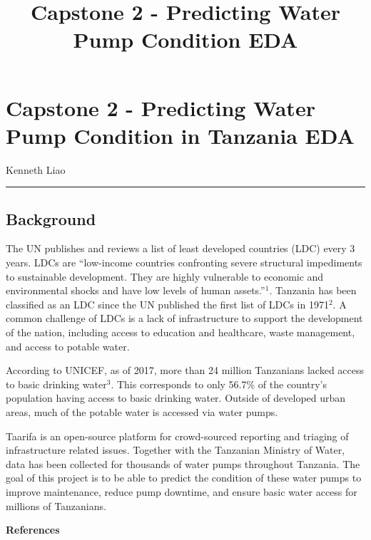 \documentclass[11pt]{article}
\title{Capstone 2 - Predicting Water Pump Condition EDA}
\begin{document}
    
    
    \maketitle
    
    

    
    \section{Capstone 2 - Predicting Water Pump Condition in Tanzania
EDA}\label{capstone-2---predicting-water-pump-condition-in-tanzania-eda}

    Kenneth Liao

    \begin{center}\rule{0.5\linewidth}{\linethickness}\end{center}

    \subsection{Background}\label{background}

    The UN publishes and reviews a list of least developed countries (LDC)
every 3 years. LDCs are ``low-income countries confronting severe
structural impediments to sustainable development. They are highly
vulnerable to economic and environmental shocks and have low levels of
human assets.''\(^{1}\). Tanzania has been classified as an LDC since
the UN published the first list of LDCs in 1971\(^{2}\). A common
challenge of LDCs is a lack of infrastructure to support the development
of the nation, including access to education and healthcare, waste
management, and access to potable water.

According to UNICEF, as of 2017, more than 24 million Tanzanians lacked
access to basic drinking water\(^{3}\). This corresponds to only 56.7\%
of the country's population having access to basic drinking water.
Outside of developed urban areas, much of the potable water is accessed
via water pumps.

Taarifa is an open-source platform for crowd-sourced reporting and
triaging of infrastructure related issues. Together with the Tanzanian
Ministry of Water, data has been collected for thousands of water pumps
throughout Tanzania. The goal of this project is to be able to predict
the condition of these water pumps to improve maintenance, reduce pump
downtime, and ensure basic water access for millions of Tanzanians.

    \textbf{References}
\end{document}

